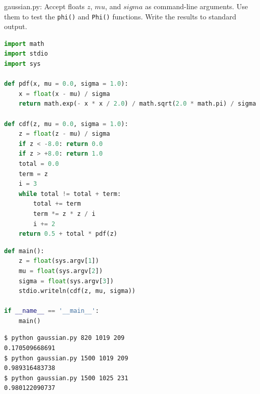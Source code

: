 \documentclass[8pt,a4paper,compress,handout]{beamer}
\begin{document}
\begin{frame}[fragile]
\begin{framed}
\tiny gaussian.py: Accept floats $z$, $mu$, and $sigma$ as command-line arguments. Use them to test the \lstinline{phi()} and \lstinline{Phi()} functions. Write the results to standard output.
\end{framed}

\begin{lstlisting}[language=Python]
import math
import stdio
import sys

def pdf(x, mu = 0.0, sigma = 1.0):
    x = float(x - mu) / sigma
    return math.exp(- x * x / 2.0) / math.sqrt(2.0 * math.pi) / sigma

def cdf(z, mu = 0.0, sigma = 1.0):
    z = float(z - mu) / sigma
    if z < -8.0: return 0.0
    if z > +8.0: return 1.0
    total = 0.0
    term = z
    i = 3
    while total != total + term:
        total += term
        term *= z * z / i
        i += 2
    return 0.5 + total * pdf(z)
\end{lstlisting}
\end{frame}

\begin{frame}[fragile]
\begin{lstlisting}[language=Python]
def main():
    z = float(sys.argv[1])
    mu = float(sys.argv[2])
    sigma = float(sys.argv[3])
    stdio.writeln(cdf(z, mu, sigma))

if __name__ == '__main__':
    main()
\end{lstlisting}

\begin{lstlisting}[language={}]
$ python gaussian.py 820 1019 209
0.170509668691
$ python gaussian.py 1500 1019 209
0.989316483738
$ python gaussian.py 1500 1025 231
0.980122090737
\end{lstlisting}
\end{frame}
\end{document}
